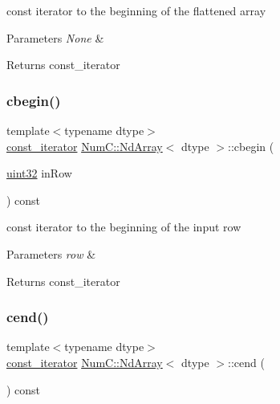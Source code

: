 const iterator to the beginning of the flattened array


\begin{DoxyParams}{Parameters}
{\em None} & \\
\hline
\end{DoxyParams}
\begin{DoxyReturn}{Returns}
const\+\_\+iterator 
\end{DoxyReturn}
\mbox{\label{class_num_c_1_1_nd_array_a15d151b34c7fa94d5710f07fe2327663}} 
\subsubsection{\texorpdfstring{cbegin()}{cbegin()}\hspace{0.1cm}{\footnotesize\ttfamily [2/2]}}
{\footnotesize\ttfamily template$<$typename dtype$>$ \\
\mbox{\hyperlink{class_num_c_1_1_nd_array_a445cec326684b0066bddae07ba06eddf}{const\+\_\+iterator}} \mbox{\hyperlink{class_num_c_1_1_nd_array}{Num\+C\+::\+Nd\+Array}}$<$ dtype $>$\+::cbegin (\begin{DoxyParamCaption}\item[{\mbox{\hyperlink{namespace_num_c_ae685802ca6d3035f2b400b081e3953fa}{uint32}}}]{in\+Row }\end{DoxyParamCaption}) const\hspace{0.3cm}{\ttfamily [inline]}}

const iterator to the beginning of the input row


\begin{DoxyParams}{Parameters}
{\em row} & \\
\hline
\end{DoxyParams}
\begin{DoxyReturn}{Returns}
const\+\_\+iterator 
\end{DoxyReturn}
\mbox{\label{class_num_c_1_1_nd_array_a7299d5d8949b5348dde9d05f96f20b59}} 
\subsubsection{\texorpdfstring{cend()}{cend()}\hspace{0.1cm}{\footnotesize\ttfamily [1/2]}}
{\footnotesize\ttfamily template$<$typename dtype$>$ \\
\mbox{\hyperlink{class_num_c_1_1_nd_array_a445cec326684b0066bddae07ba06eddf}{const\+\_\+iterator}} \mbox{\hyperlink{class_num_c_1_1_nd_array}{Num\+C\+::\+Nd\+Array}}$<$ dtype $>$\+::cend (\begin{DoxyParamCaption}{ }\end{DoxyParamCaption}) const\hspace{0.3cm}{\ttfamily [inline]}}

